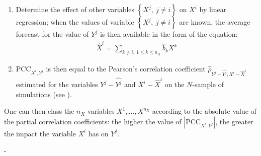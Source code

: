 {\begin{enumerate}
  \item Determine the effect of other variables $\left\{ X^j,\ j\neq i \right\}$ on $X^i$ by linear regression; when the values of variable $\left\{ X^j,\ j\neq i \right\}$ are known, the average forecast for the value of $Y^j$ is then available in the form of the equation:
    \begin{align*}
      \widehat{X}^i = \sum_{k \neq i,\ 1 \leq k \leq n_X} \widehat{b}_k X^k
    \end{align*}

  \item $\textrm{PCC}_{X^i,Y^j}$ is then equal to the Pearson's correlation coefficient $\widehat{\rho}_{Y^j-\widehat{Y^j},X^i-\widehat{X}^i}$  estimated for the variables  $Y^j-\widehat{Y^j}$ and $X^i-\widehat{X}^i$ on the $N$-sample of simulations (see ).
  \end{enumerate}

  One can then class the $n_X$ variables $X^1,\ldots, X^{n_X}$ according to the absolute value of the partial correlation coefficients: the higher the value of $\left| \textrm{PCC}_{X^i,Y^j} \right|$, the greater the impact the variable $X^i$ has on $Y^j$.

}
{
  -
}


